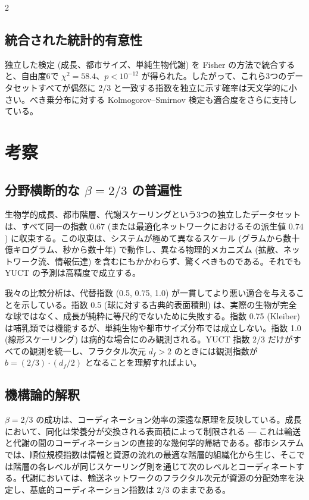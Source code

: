 \documentclass[11pt,a4paper]{article}
\newcommand{\df}{d_f}
\begin{document}
\begin{multicols}{2}
		\subsection{統合された統計的有意性}
		
		独立した検定 (成長、都市サイズ、単純生物代謝) を Fisher の方法で統合すると、自由度6で \(\chi^2 = 58.4\)、\(p < 10^{-12}\) が得られた。したがって、これら3つのデータセットすべてが偶然に \(2/3\) と一致する指数を独立に示す確率は天文学的に小さい。べき乗分布に対する Kolmogorov–Smirnov 検定も適合度をさらに支持している。
		
		\section{考察}
		
		\subsection{分野横断的な \(\beta = 2/3\) の普遍性}
		
		生物学的成長、都市階層、代謝スケーリングという3つの独立したデータセットは、すべて同一の指数 \(0.67\) (または最適化ネットワークにおけるその派生値 \(0.74\)) に収束する。この収束は、システムが極めて異なるスケール (グラムから数十億キログラム、秒から数十年) で動作し、異なる物理的メカニズム (拡散、ネットワーク流、情報伝達) を含むにもかかわらず、驚くべきものである。それでも YUCT の予測は高精度で成立する。
		
		我々の比較分析は、代替指数 (0.5, 0.75, 1.0) が一貫してより悪い適合を与えることを示している。指数 0.5 (球に対する古典的表面積則) は、実際の生物が完全な球ではなく、成長が純粋に等尺的でないために失敗する。指数 0.75 (Kleiber) は哺乳類では機能するが、単純生物や都市サイズ分布では成立しない。指数 1.0 (線形スケーリング) は病的な場合にのみ観測される。YUCT 指数 \(2/3\) だけがすべての観測を統一し、フラクタル次元 \(\df > 2\) のときには観測指数が \(b = (2/3) \cdot (\df/2)\) となることを理解すればよい。
		
		\subsection{機構論的解釈}
		
		\(\beta = 2/3\) の成功は、コーディネーション効率の深遠な原理を反映している。成長において、同化は栄養分が交換される表面積によって制限される — これは輸送と代謝の間のコーディネーションの直接的な幾何学的帰結である。都市システムでは、順位規模指数は情報と資源の流れの最適な階層的組織化から生じ、そこでは階層の各レベルが同じスケーリング則を通じて次のレベルとコーディネートする。代謝においては、輸送ネットワークのフラクタル次元が資源の分配効率を決定し、基底的コーディネーション指数は \(2/3\) のままである。
		

\end{multicols}
\end{document}
